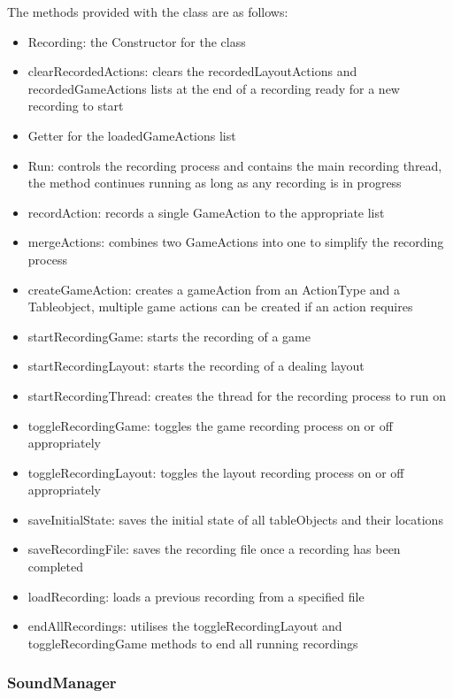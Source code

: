 \documentclass[a4paper]{project}
\begin{document}
				The methods provided with the class are as follows:
				
				\begin{itemize}
					\item Recording: the Constructor for the class
					\item clearRecordedActions: clears the recordedLayoutActions and recordedGameActions lists at the end of a recording ready for a new recording to start
					\item Getter for the loadedGameActions list
					\item Run: controls the recording process and contains the main recording thread, the method continues running as long as any recording is in progress
					\item recordAction: records a single GameAction to the appropriate list
					\item mergeActions: combines two GameActions into one to simplify the recording process
					\item createGameAction: creates a gameAction from an ActionType and a Tableobject, multiple game actions can be created if an action requires
					\item startRecordingGame: starts the recording of a game
					\item startRecordingLayout: starts the recording of a dealing layout
					\item startRecordingThread: creates the thread for the recording process to run on 
					\item toggleRecordingGame: toggles the game recording process on or off appropriately
					\item toggleRecordingLayout: toggles the layout recording process on or off appropriately
					\item saveInitialState: saves the initial state of all tableObjects and their locations
					\item saveRecordingFile: saves the recording file once a recording has been completed
					\item loadRecording: loads a previous recording from a specified file
					\item endAllRecordings: utilises the toggleRecordingLayout and toggleRecordingGame methods to end all running recordings
				\end{itemize}
				
			\subsubsection{SoundManager}\label{subsubsec:soundManager}
				
\end{document}
